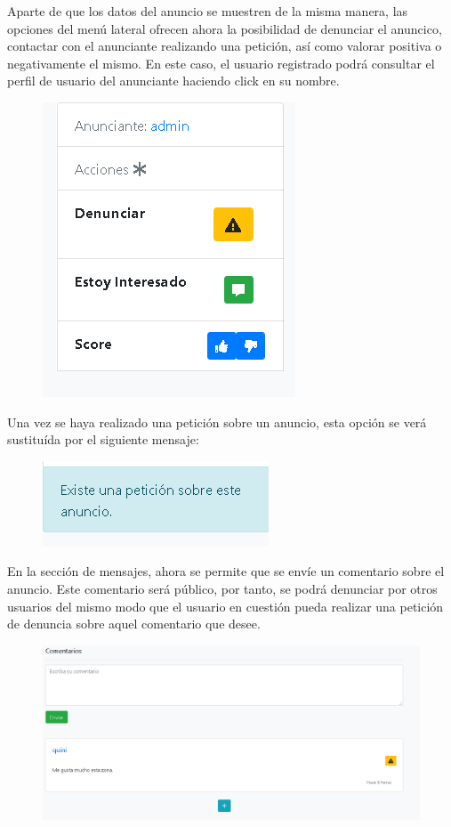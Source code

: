 Aparte de que los datos del anuncio se muestren de la misma manera, las opciones del men\'{u} lateral ofrecen ahora la posibilidad de denunciar el anuncico, contactar con el anunciante realizando una petici\'{o}n, as\'{i} como valorar positiva o negativamente el  mismo. En este caso, el usuario registrado podr\'{a} consultar el perfil de usuario del anunciante haciendo click en su nombre.

\begin{figure}[h!]
\centering
\includegraphics[width=.3\textwidth]{Img/ManualUsuario/LATERAL_AD_USER_NO_PETICION.png}
\end{figure}

Una vez se haya realizado una petici\'{o}n sobre un anuncio, esta opci\'{o}n se ver\'{a} sustitu\'{i}da por el siguiente mensaje:
\begin{figure}[h!]
\centering
\includegraphics[width=.3\textwidth]{Img/ManualUsuario/LATERAL_AD_USER_PETICION.png}
\end{figure}

En la secci\'{o}n de mensajes, ahora se permite que se env\'{i}e un comentario sobre el anuncio. Este comentario ser\'{a} p\'{u}blico, por tanto, se podr\'{a} denunciar por otros usuarios del mismo modo que el usuario en cuesti\'{o}n pueda realizar una petici\'{o}n de denuncia sobre aquel comentario que desee.


\begin{figure}[h!]
\centering
\includegraphics[width=1\textwidth]{Img/ManualUsuario/USER_AD_COMMENTS.png}
\end{figure}


